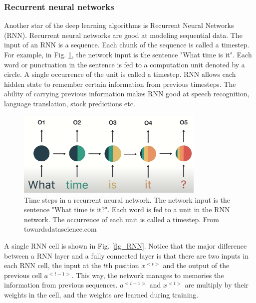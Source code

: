 \subsubsection{Recurrent neural networks}
Another star of the deep learning algorithms is Recurrent Neural Networks (RNN). Recurrent neural networks are good at modeling sequential data. The input of an RNN is a sequence. Each chunk of the sequence is called a timestep. For example, in Fig. \ref{fig_RNN_timestep}, the network input is the sentence "What time is it". Each word or punctuation in the sentence is fed to a computation unit denoted by a circle. A single occurrence of the unit is called a timestep. RNN allows each hidden state to remember certain information from previous timesteps. The ability of carrying previous information makes RNN good at speech recognition, language translation, stock predictions etc. 
\begin{figure}[h!]
\begin{center}
\includegraphics[width = 9cm]{img/RNN.png}
\caption{Time steps in a recurrent neural network. The network input is the sentence "What time is it?". Each word is fed to a unit in the RNN network. The occurrence of each unit is called a timestep. From towardsdatascience.com \label{fig_RNN_timestep}}
\end{center}
\end{figure}

 A single RNN cell is shown in Fig. \ref{fig_RNN}. Notice that the major difference between a RNN layer and a fully connected layer is that there are two inputs in each RNN cell, the input at the $t$th position $x^{<t>}$ and the output of the previous cell $a^{<t-1>}$. This way, the network manages to memories the information from previous sequences. $a^{<t-1>}$ and $x^{<t>}$ are multiply by their weights in the cell, and the weights are learned during training. 

